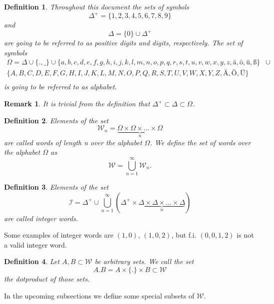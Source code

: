 \documentclass{scrartcl}
\newtheorem{mydef}{Definition}
\newtheorem{remark}{Remark}
\begin{document}
\begin{mydef}
Throughout this document the sets of symbols
\begin{equation}
\Delta^+=\{1,2,3,4,5,6,7,8,9\}
\end{equation}
and
\begin{equation}
\Delta=\{0\}\cup\Delta^+
\end{equation}
are going to be referred to as \emph{positive digits} and \emph{digits}, respectively. The set of symbols
\begin{equation}
\begin{split}
\Omega=\Delta \cup \{.,\_\}\cup\{a,b,c,d,e,f,g,h,i,j,k,l,m,n,o,p,q,r,s,t,u,v,w,x,y,z,ä,ö,ü,ß\} & \cup\\
\{A,B,C,D,E,F,G,H,I,J,K,L,M,N,O,P,Q,R,S,T,U,V,W,X,Y,Z,Ä,Ö,Ü\} & \\
\end{split}
\end{equation}
is going to be referred to as \emph{alphabet}.
\end{mydef}

\begin{remark}
It is trivial from the definition that $\Delta^+\subset\Delta\subset\Omega$.
\end{remark}

\begin{mydef}
Elements of the set $$\mathcal{W}_n=\underbrace{\Omega\times \Omega\times\ldots \times \Omega}_{n}$$ are called \emph{words of length n over the alphabet $\Omega$}. We define the \emph{set of words over the alphabet $\Omega$} as $$\mathcal{W}=\bigcup_{n=1}^{\infty}\mathcal{W}_n.$$
\end{mydef}

\begin{mydef}
Elements of the set
$$\mathcal{I}=\Delta^+\cup\bigcup_{n=1}^{\infty}(\Delta^+\times\underbrace{\Delta\times \Delta\times\ldots \times \Delta}_{n})$$
are called \emph{integer words}.
\end{mydef}

Some examples of integer words are $(1,0)$, $(1,0,2)$, but f.i. $(0,0,1,2)$ is not a valid integer word.

\begin{mydef}
Let $A,B\subset\mathcal{W}$ be arbitrary sets. We call the set 
$$A.B=A\times\{.\}\times B\subset\mathcal{W}$$
the \emph{dotproduct} of those sets.
\end{mydef}

In the upcoming subsections we define some special subsets of $\mathcal{W}$.
\end{document}
